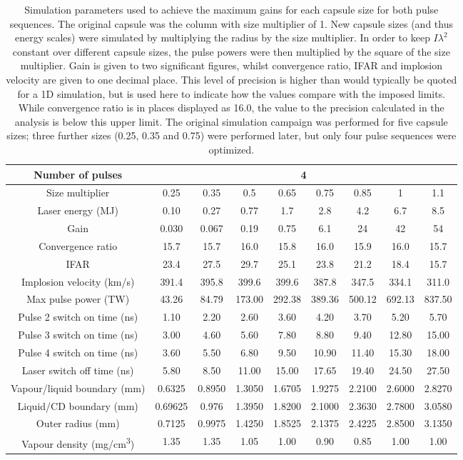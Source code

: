 \begin{table}
{\begin{tabular}{|c|c|c|c|c|c|c|c|c|}
Number of pulses & \multicolumn{8}{c|}{4} \\
\hline
Size multiplier & 0.25 & 0.35 & 0.5 & 0.65 & 0.75 & 0.85 & 1 & 1.1 \\ 
\hline
Laser energy (MJ) & 0.10  & 0.27 & 0.77 & 1.7 & 2.8 & 4.2 & 6.7 & 8.5\\ 
Gain & 0.030 & 0.067 & 0.19 & 0.75 & 6.1 & 24 & 42 & 54\\ 
Convergence ratio & 15.7 & 15.7 & 16.0 & 15.8 & 16.0 & 15.9 & 16.0 & 15.7\\ 
IFAR & 23.4 & 27.5 & 29.7 & 25.1 & 23.8 & 21.2 & 18.4 & 15.7\\ 
Implosion velocity (km/s) & 391.4 & 395.8 & 399.6 & 399.6 & 387.8 & 347.5 & 334.1 & 311.0\\ 
Max pulse power (TW) & 43.26 & 84.79 & 173.00 & 292.38 & 389.36 &500.12 & 692.13 & 837.50\\ 
Pulse 2 switch on time (ns) & 1.10 & 2.20 & 2.60 & 3.60 & 4.20 & 3.70 & 5.20 & 5.70\\ 
Pulse 3 switch on time (ns) & 3.00 & 4.60 & 5.60 & 7.80 & 8.80 & 9.40 & 12.80 & 15.00\\ 
Pulse 4 switch on time (ns) & 3.60 & 5.50 & 6.80 & 9.50 & 10.90 & 11.40 & 15.30 & 18.00\\ 
Laser switch off time (ns) & 5.80 & 8.50 & 11.00 & 15.00 & 17.65 & 19.40 & 24.50 & 27.50\\ 
Vapour/liquid boundary (\si[per-mode=symbol]{\milli\meter}) & 0.6325 & 0.8950 & 1.3050 & 1.6705 & 1.9275 & 2.2100 & 2.6000 & 2.8270\\ 
Liquid/CD boundary (\si[per-mode=symbol]{\milli\meter}) & 0.69625 & 0.976 & 1.3950 & 1.8200 & 2.1000 & 2.3630 & 2.7800 & 3.0580\\ 
Outer radius (\si[per-mode=symbol]{\milli\meter}) & 0.7125 & 0.9975 & 1.4250 & 1.8525 & 2.1375 & 2.4225 & 2.8500 & 3.1350\\ 
Vapour density (\si[per-mode=symbol]{\milli\gram\per\centi\meter\cubed}) & 1.35 & 1.35 & 1.05 & 1.00 & 0.90 & 0.85 & 1.00 & 1.00\\
\hline
\end{tabular}}
\caption{Simulation parameters used to achieve the maximum gains for each capsule size for both pulse sequences. The original capsule was the column with size multiplier of 1. New capsule sizes (and thus energy scales) were simulated by multiplying the radius by the size multiplier. In order to keep $I\lambda^2$ constant over different capsule sizes, the pulse powers were then multiplied by the square of the size multiplier. Gain is given to two significant figures, whilst convergence ratio, IFAR and implosion velocity are given to one decimal place. This level of precision is higher than would typically be quoted for a 1D simulation, but is used here to indicate how the values compare with the imposed limits. While convergence ratio is in places displayed as 16.0, the value to the precision calculated in the analysis is below this upper limit. The original simulation campaign was performed for five capsule sizes; three further sizes (0.25, 0.35 and 0.75) were performed later, but only four pulse sequences were optimized.}
\label{tab:ThirdHarmonic}
\end{table}

